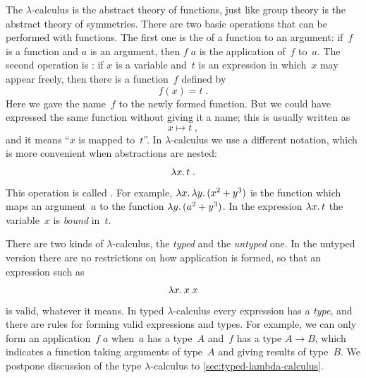 The $\lambda$-calculus is the abstract theory of functions, just like
group theory is the abstract theory of symmetries. There are two basic
operations that can be performed with functions. The first one is the
 of a function to an argument: if~$f$ is a function
and $a$ is an argument, then $f\; a$ is the application of~$f$ to~$a$.
The second operation is : if $x$ is a variable
and~$t$ is an expression in which~$x$ may appear freely, then there is
a function~$f$ defined by
%
\begin{equation*}
  f(x) = t \;.
\end{equation*}
%
Here we gave the name~$f$ to the newly formed function. But we could
have expressed the same function without giving it a name;
this is usually written as
%
\begin{equation*}
  x \mapsto t \;,
\end{equation*}
%
and it means ``$x$ is mapped to~$t$''. In $\lambda$-calculus we use a
different notation, which is more convenient when abstractions are
nested:
%
\begin{equation*}
  \lambda x .\,t \;.
\end{equation*}
%
This operation is called . For example,
$\lambda x .\,\lambda y .\,(x^2 + y^3)$ is the function which maps an
argument~$a$ to the function $\lambda y .\,(a^2 + y^3)$. In the expression
$\lambda x .\,t$ the variable~$x$ is \emph{bound} in~$t$.

There are two kinds of $\lambda$-calculus, the \emph{typed} and the
\emph{untyped} one. In the untyped version there are no restrictions
on how application is formed, so that an expression such as
%
\begin{equation*}
  \lambda x .\,x\; x
\end{equation*}
%
is valid, whatever it means. In typed $\lambda$-calculus every
expression has a \emph{type}, and there are rules for forming valid
expressions and types. For example, we can only form an
application~$f\; a$ when~$a$ has a type~$A$ and~$f$ has a type $A \to
B$, which indicates a function taking arguments of type~$A$ and giving
results of type~$B$. We postpone discussion of the type
$\lambda$-calculus to \cref{sec:typed-lambda-calculus}.

